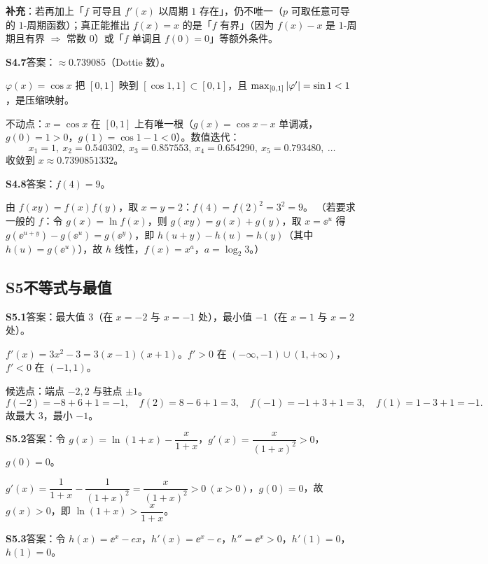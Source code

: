 \textbf{补充}：若再加上「$f$ 可导且 $f'(x)$ 以周期 $1$ 存在」，仍不唯一（$p$ 可取任意可导的 $1$-周期函数）；真正能推出 $f(x)=x$ 的是「$f$ 有界」（因为 $f(x)-x$ 是 $1$-周期且有界 $\Rightarrow$ 常数 $0$）或「$f$ 单调且 $f(0)=0$」等额外条件。

\medskip
\noindent\textbf{S4.7}\quad 答案：$\approx0.739085$（Dottie 数）。

$\varphi(x)=\cos x$ 把 $[0,1]$ 映到 $[\cos1,1]\subset[0,1]$，且 $\max_{[0,1]}\left\lvert \varphi'\right\rvert=\sin1<1$，是压缩映射。

不动点：$x=\cos x$ 在 $[0,1]$ 上有唯一根（$g(x)=\cos x-x$ 单调减，$g(0)=1>0$，$g(1)=\cos1-1<0$）。数值迭代：
\[
x_1=1,\ x_2=0.540302,\ x_3=0.857553,\ x_4=0.654290,\ x_5=0.793480,\ \dots
\]
收敛到 $x\approx0.7390851332$。

\medskip
\noindent\textbf{S4.8}\quad 答案：$f(4)=9$。

由 $f(xy)=f(x)f(y)$，取 $x=y=2$：$f(4)=f(2)^{2}=3^{2}=9$。
（若要求一般的 $f$：令 $g(x)=\ln f(x)$，则 $g(xy)=g(x)+g(y)$，取 $x=\ee^{u}$ 得 $g(\ee^{u+y})-g(\ee^{u})=g(\ee^{y})$，即 $h(u+y)-h(u)=h(y)$（其中 $h(u)=g(\ee^{u})$），故 $h$ 线性，$f(x)=x^{a}$，$a=\log_2 3$。）

\subsection{S5\quad 不等式与最值}

\noindent\textbf{S5.1}\quad 答案：最大值 $3$（在 $x=-2$ 与 $x=-1$ 处），最小值 $-1$（在 $x=1$ 与 $x=2$ 处）。

$f'(x)=3x^{2}-3=3(x-1)(x+1)$。$f'>0$ 在 $(-\infty,-1)\cup(1,+\infty)$，$f'<0$ 在 $(-1,1)$。

候选点：端点 $-2,2$ 与驻点 $\pm1$。
\[
f(-2)=-8+6+1=-1,\quad f(2)=8-6+1=3,\quad f(-1)=-1+3+1=3,\quad f(1)=1-3+1=-1.
\]
故最大 $3$，最小 $-1$。

\medskip
\noindent\textbf{S5.2}\quad 答案：令 $g(x)=\ln(1+x)-\dfrac{x}{1+x}$，$g'(x)=\dfrac{x}{(1+x)^{2}}>0$，$g(0)=0$。

$g'(x)=\dfrac{1}{1+x}-\dfrac{1}{(1+x)^{2}}=\dfrac{x}{(1+x)^{2}}>0\ (x>0)$，$g(0)=0$，故 $g(x)>0$，即 $\ln(1+x)>\dfrac{x}{1+x}$。

\medskip
\noindent\textbf{S5.3}\quad 答案：令 $h(x)=\ee^{x}-ex$，$h'(x)=\ee^{x}-e$，$h''=\ee^{x}>0$，$h'(1)=0$，$h(1)=0$。

